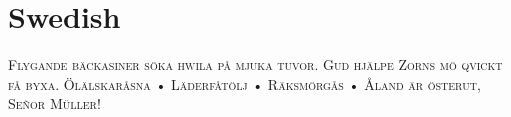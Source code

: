 

\presection\section*{\checkyes Swedish}\postsection

\textsc{
Flygande bäckasiner söka hwila på mjuka tuvor. 
Gud hjälpe Zorns mö qvickt få byxa.
Ölälskaråsna • Läderfåtölj • Räksmörgås • Åland är österut, Señor Müller!}